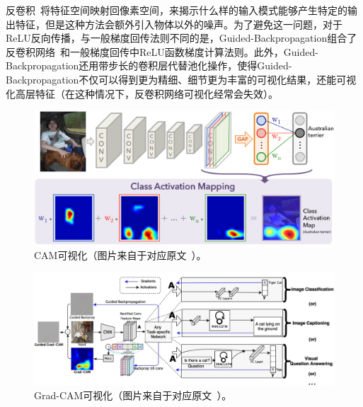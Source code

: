 反卷积~\cite{zeiler2010deconvolutional}将特征空间映射回像素空间，来揭示什么样的输入模式能够产生特定的输出特征，但是这种方法会额外引入物体以外的噪声。为了避免这一问题，对于ReLU反向传播，与一般梯度回传法则不同的是，Guided-Backpropagation组合了反卷积网络~\cite{zeiler2010deconvolutional}和一般梯度回传中ReLU函数梯度计算法则。此外，Guided-Backpropagation还用带步长的卷积层代替池化操作，使得Guided-Backpropagation不仅可以得到更为精细、细节更为丰富的可视化结果，还能可视化高层特征（在这种情况下，反卷积网络可视化经常会失效）。
\begin{figure}[h]
	\centering
	\includegraphics[width=1.0\textwidth]{figure/cam_arichitecture}
	\caption[CAM可视化]{CAM可视化（图片来自于对应原文~\cite{zhou2016learning}）。}
	\label{fig:cam_arichitecture}
\end{figure}
\begin{figure}[h]
	\centering
	\includegraphics[width=1.0\textwidth]{figure/grad_cam_architecture}
	\caption[Grad-CAM可视化]{Grad-CAM可视化（图片来自于对应原文~\cite{selvaraju2017grad}）。}
	\label{fig:grad_cam_architecture}
\end{figure}
